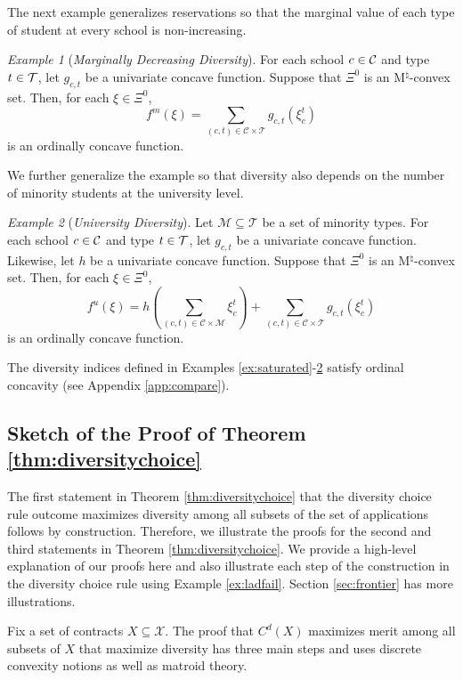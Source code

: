 \documentclass[12pt]{amsart}
\theoremstyle{remark}
\newtheorem{example}{Example}
\begin{document}
The next example generalizes reservations so that the marginal value of
each type of student at every school is non-increasing.

\begin{example}[\emph{Marginally Decreasing Diversity}]\label{ex:marginal}
For each school $c\in \mathcal{C}$ and type $t\in \mathcal{T}$, let $g_{c,t}$ be
a univariate concave function. Suppose that
$\Xi^0$ is an M$^{\natural}$-convex set. Then, for each $\xi\in \Xi^0$,
\[f^m(\xi)=\sum_{(c,t)\in \mathcal{C} \times \mathcal{T}} g_{c,t}(\xi^t_c)
\]
is an ordinally concave function.
\end{example}

We further generalize the example so that diversity also depends
on the number of minority students at the university level.

\begin{example}[\emph{University Diversity}]\label{ex:total}
Let $\mathcal{M} \subseteq \mathcal{T}$ be a set of minority types.
For each school $c\in \mathcal{C}$ and type $t\in \mathcal{T}$,
let $g_{c,t}$ be a univariate concave function. Likewise, let $h$ be a univariate concave function. Suppose that
$\Xi^0$ is an M$^{\natural}$-convex set. Then, for each $\xi\in \Xi^0$,
\[f^u(\xi)=h\left(\sum_{(c,t)\in \mathcal{C} \times \mathcal{M}} \xi^t_c\right) +
\sum_{(c,t) \in \mathcal{C} \times \mathcal{T}} g_{c,t}(\xi^t_c)
\]
is an ordinally concave function.
\end{example}

The diversity indices defined in Examples \ref{ex:saturated}-\ref{ex:total} satisfy ordinal concavity (see
Appendix \ref{app:compare}).


\subsection{Sketch of the Proof of Theorem \ref{thm:diversitychoice}}
The first statement in Theorem \ref{thm:diversitychoice} that the diversity
choice rule outcome maximizes diversity among all subsets of the set of
applications follows by construction. Therefore, we illustrate the proofs for
the second and third statements in Theorem \ref{thm:diversitychoice}.
We provide a high-level explanation of our proofs here
and also illustrate each step of the construction in the diversity choice rule using
Example \ref{ex:ladfail}. Section \ref{sec:frontier} has more illustrations.

Fix a set of contracts $X\subseteq \mathcal{X}$. The proof that
$C^d(X)$ maximizes merit among all subsets
of $X$ that maximize diversity has three main steps
and uses discrete convexity notions as well as matroid theory.
\medskip
\end{document}
